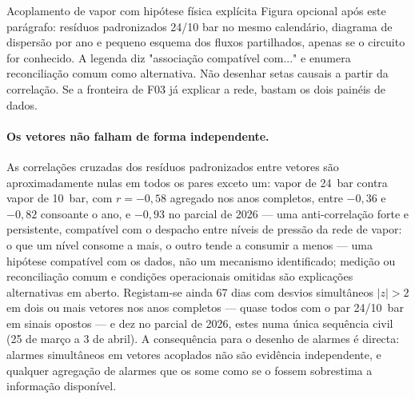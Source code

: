 {Acoplamento de vapor com hipótese física explícita}
{Figura opcional após este parágrafo: resíduos padronizados 24/10 bar
no mesmo calendário, diagrama de dispersão por ano e pequeno esquema
dos fluxos partilhados, apenas se o circuito for conhecido. A legenda
diz "associação compatível com..." e enumera reconciliação comum como
alternativa. Não desenhar setas causais a partir da correlação. Se a
fronteira de F03 já explicar a rede, bastam os dois painéis de dados.}%
\paragraph{Os vetores não falham de forma independente.} As correlações
cruzadas dos resíduos padronizados entre vetores são aproximadamente nulas
em todos os pares exceto um: vapor de 24~bar contra vapor de 10~bar, com
$r = -0{,}58$ agregado nos anos completos, entre $-0{,}36$ e $-0{,}82$
consoante o ano, e $-0{,}93$ no parcial de 2026 --- uma anti-correlação forte
e persistente, compatível com o despacho entre níveis de pressão da rede de
vapor: o que um nível consome a mais, o outro tende a consumir a menos ---
uma hipótese compatível com os dados, não um mecanismo identificado; medição
ou reconciliação comum e condições operacionais omitidas são explicações
alternativas em aberto. Registam-se ainda 67 dias com desvios simultâneos
$|z| > 2$ em dois ou mais vetores nos anos completos --- quase todos com o
par 24/10~bar em sinais opostos --- e dez no parcial de 2026, estes numa
única sequência civil (25 de março a 3 de abril). A consequência para o
desenho de alarmes é directa: alarmes
simultâneos em vetores acoplados não são evidência independente, e qualquer
agregação de alarmes que os some como se o fossem sobrestima a informação
disponível.

